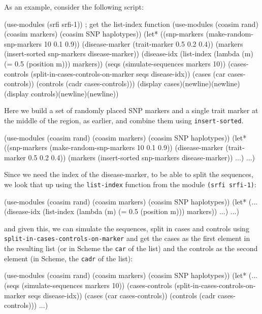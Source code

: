 \documentclass{manual}
\begin{document}
As an example, consider the following script:
\begin{code}
(use-modules (srfi srfi-1)) ; get the list-index function
(use-modules (coasim rand) (coasim markers) (coasim SNP haplotypes))
(let* ((snp-markers    (make-random-snp-markers 10 0.1 0.9))
       (disease-marker (trait-marker 0.5 0.2 0.4))
       (markers (insert-sorted snp-markers disease-marker))
       (disease-idx (list-index (lambda (m) (= 0.5 (position m))) markers))
       (seqs (simulate-sequences markers 10))
       (cases-controls (split-in-cases-controls-on-marker seqs disease-idx))
       (cases (car cases-controls))
       (controls (cadr cases-controls)))
  (display cases)(newline)(newline)
  (display controls)(newline)(newline))
\end{code}
Here we build a set of randomly placed SNP markers and a single trait
marker at the middle of the region, as earlier, and combine them using
\texttt{insert-sorted}.
\begin{code}
(use-modules (coasim rand) (coasim markers) (coasim SNP haplotypes))
(let* ((snp-markers    (make-random-snp-markers 10 0.1 0.9))
       (disease-marker (trait-marker 0.5 0.2 0.4))
       (markers (insert-sorted snp-markers disease-marker))
       ...)
  ...)
\end{code}
Since we need the index of the disease-marker, to be able to split the
sequences, we look that up using the \texttt{list-index} function from
the module \texttt{(srfi srfi-1)}:
\begin{code}
(use-modules (coasim rand) (coasim markers) (coasim SNP haplotypes))
(let* (...
       (disease-idx (list-index (lambda (m) (= 0.5 (position m))) markers))
       ...)
  ...)
\end{code}
and given this, we can simulate the sequences, split in cases and
controls using \texttt{split-in-cases-controls-on-marker} and get the cases as
the first element in the resulting list (or in Scheme the \texttt{car}
of the list) and the controls as the second element (in Scheme, the
\texttt{cadr} of the list):
\begin{code}
(use-modules (coasim rand) (coasim markers) (coasim SNP haplotypes))
(let* (...
       (seqs (simulate-sequences markers 10))
       (cases-controls (split-in-cases-controls-on-marker seqs disease-idx))
       (cases (car cases-controls))
       (controls (cadr cases-controls)))
  ...)
\end{code}
\end{document}
